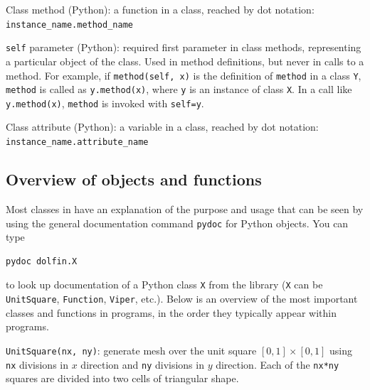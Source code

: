 Class method (Python): a function in a class, reached by dot notation: {\fontsize{10pt}{10pt}\verb!instance_name.method_name!}\gln

{\fontsize{10pt}{10pt}\texttt{self}} parameter (Python): required first parameter in class methods,
representing a particular object of the class.
Used in method definitions, but never in calls to a method.
For example, if {\fontsize{10pt}{10pt}\texttt{method(self, x)}} is the definition of
{\fontsize{10pt}{10pt}\texttt{method}} in a class {\fontsize{10pt}{10pt}\texttt{Y}}, {\fontsize{10pt}{10pt}\texttt{method}} is called as
{\fontsize{10pt}{10pt}\texttt{y.method(x)}}, where {\fontsize{10pt}{10pt}\texttt{y}} is an instance of class {\fontsize{10pt}{10pt}\texttt{X}}.
In a call like {\fontsize{10pt}{10pt}\texttt{y.method(x)}}, {\fontsize{10pt}{10pt}\texttt{method}} is invoked with
{\fontsize{10pt}{10pt}\texttt{self=y}}.\gln

Class attribute (Python): a variable in a class, reached by dot notation: {\fontsize{10pt}{10pt}\verb!instance_name.attribute_name!}\gln


\subsection{Overview of objects and functions}


Most classes in \fenics{} have an explanation of the purpose and usage
that can be seen by using the general documentation command
{\fontsize{10pt}{10pt}\texttt{pydoc}} for Python objects. You can type
\begin{Verbatim}[fontsize=\fontsize{10pt}{10pt},tabsize=8,baselinestretch=0.85,
fontfamily=tt,xleftmargin=7mm]
pydoc dolfin.X
\end{Verbatim}
\noindent
to look up documentation of a Python class {\fontsize{10pt}{10pt}\texttt{X}} from the \dolfin{}
library ({\fontsize{10pt}{10pt}\texttt{X}} can be {\fontsize{10pt}{10pt}\texttt{UnitSquare}}, {\fontsize{10pt}{10pt}\texttt{Function}},
{\fontsize{10pt}{10pt}\texttt{Viper}}, etc.). Below is an overview of the most important classes
and functions
in \fenics{} programs, in the order they typically appear within programs.\gln

{\fontsize{10pt}{10pt}\texttt{UnitSquare(nx, ny)}}: generate mesh over the unit square
$[0,1]\times [0,1]$ using {\fontsize{10pt}{10pt}\texttt{nx}} divisions in $x$ direction and
{\fontsize{10pt}{10pt}\texttt{ny}} divisions in $y$ direction. Each of the {\fontsize{10pt}{10pt}\texttt{nx*ny}} squares
are divided into two cells of triangular shape.\gln

